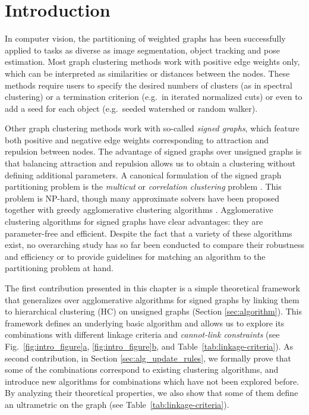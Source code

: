 \section{Introduction}
In computer vision, the partitioning of weighted graphs has been successfully applied to tasks as diverse as image segmentation, object tracking and pose estimation. 
Most graph clustering methods work with positive edge weights only, which can be interpreted as similarities or distances between the nodes. These methods require users to specify the desired numbers of clusters (as in spectral clustering) or a termination criterion (e.g.\ in iterated normalized cuts) or even to add a seed for each object  (e.g.\ seeded watershed or random walker).  

Other graph clustering methods work with so-called \emph{signed graphs}, which feature both positive and negative edge weights corresponding to attraction and repulsion between nodes. The advantage of signed graphs over unsigned graphs is that balancing attraction and repulsion allows us to obtain a clustering without defining additional parameters. A canonical formulation of the signed graph partitioning problem is the \emph{multicut} or \emph{correlation clustering} problem \cite{kappes2011globally,chopra1991multiway}. This problem is NP-hard, though many approximate solvers have been proposed \cite{lange2018combinatorial,pape2017solving,beier2016efficient,yarkony2012fast} together with greedy agglomerative clustering algorithms \cite{keuper2015efficient,levinkov2017comparative,wolf2018mutex,kardoostsolving}. 
Agglomerative clustering algorithms for signed graphs have clear advantages: they are parameter-free and efficient. Despite the fact that a variety of these algorithms exist, no overarching study has so far been conducted to compare their robustness and efficiency or to provide guidelines for matching an algorithm to the partitioning problem at hand. 


The first contribution presented in this chapter is a simple theoretical framework that generalizes over agglomerative algorithms for signed graphs by linking them to hierarchical clustering (HC) on unsigned graphs (Section \ref{sec:algorithm}). This framework defines an underlying basic algorithm and allows us to explore its combinations with different linkage criteria and \emph{cannot-link constraints} (see Fig.~\hyperref[fig:intro_figure]{\ref*{fig:intro_figure}a}, \hyperref[fig:intro_figure]{\ref*{fig:intro_figure}b}, and Table~\ref{tab:linkage-criteria}). 
As second contribution, in Section \ref{sec:alg_update_rules}, we formally prove that some of the combinations correspond to existing clustering algorithms, and introduce new algorithms for combinations which have not been explored before. By analyzing their theoretical properties, we also show that some of them define an ultrametric on the graph (see Table~\ref{tab:linkage-criteria}).

